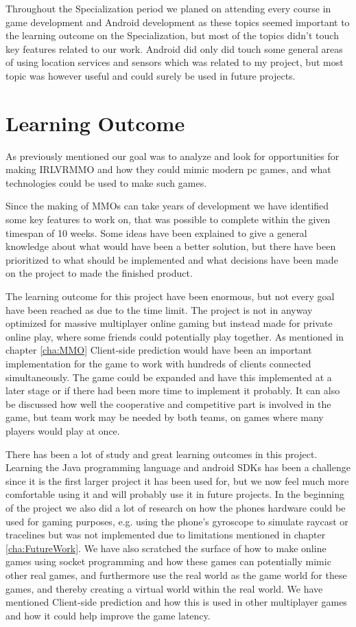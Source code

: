 Throughout the Specialization period we planed on attending every course in game development and Android development as these topics seemed important to the learning outcome on the Specialization, but most of the topics didn't touch key features related to our work. Android did only did touch some general areas of using location services and sensors which was related to my project, but most topic was however useful and could surely be used in future projects.


\section{Learning Outcome}

As previously mentioned our goal was to analyze and look for opportunities for making IRLVRMMO and how they could mimic modern pc games, and what technologies could be used to make such games.

Since the making of MMOs can take years of development we have identified some key features to work on, that was possible to complete within the given timespan of 10 weeks. Some ideas have been explained to give a general knowledge about what would have been a better solution, but there have been prioritized to what should be implemented and what decisions have been made on the project to made the finished product.

The learning outcome for this project have been enormous, but not every goal have been reached as due to the time limit. The project is not in anyway optimized for massive multiplayer online gaming but instead made for private online play, where some friends could potentially play together. As mentioned in chapter \ref{cha:MMO} Client-side prediction would have been an important implementation for the game to work with hundreds of clients connected simultaneously. The game could be expanded and have this implemented at a later stage or if there had been more time to implement it probably. It can also be discussed how well the cooperative and competitive part is involved in the game, but team work may be needed by both teams, on games where many players would play at once.

There has been a lot of study and great learning outcomes in this project. Learning the Java programming language and android SDKs has been a challenge since it is the first larger project it has been used for, but we now feel much more comfortable using it and will probably use it in future projects. In the beginning of the project we also did a lot of research on how the phones hardware could be used for gaming purposes, e.g. using the phone's gyroscope to simulate raycast or tracelines but was not implemented due to limitations mentioned in chapter \ref{cha:FutureWork}. We have also scratched the surface of how to make online games using socket programming and how these games can potentially mimic other real games, and furthermore use the real world as the game world for these games, and thereby creating a virtual world within the real world. We have mentioned Client-side prediction and how this is used in other multiplayer games and how it could help improve the game latency.


